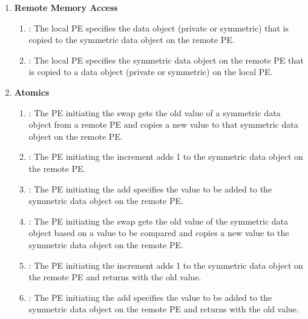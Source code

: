 \begin{enumerate}
\item \textbf{Remote Memory Access}
\begin{enumerate}
    \item \PUT:  The local \ac{PE} specifies the \source{} data object (private
        or symmetric) that is copied to the symmetric data object on the remote
        \ac{PE}. 
  \item \GET:  The local \ac{PE} specifies the symmetric data object on the remote
      \ac{PE} that is copied to a data object (private or symmetric) on the local
      \ac{PE}. 
\end{enumerate}

\item \textbf{Atomics}
\begin{enumerate}
    \item {}:  The \ac{PE} initiating the swap gets the old value 
    of a symmetric data object from a remote \ac{PE} and copies a new value to
        that symmetric data object on the remote \ac{PE}.
  \item {}:  The \ac{PE} initiating the increment adds 1 to the
      symmetric data object on the remote \ac{PE}.
  \item {}:  The \ac{PE} initiating the add specifies the value to be added
      to the symmetric data object on the remote \ac{PE}.
  \item {}:  The \ac{PE} initiating the 
  swap gets the old value of the symmetric data object based on a value to be compared and 
  copies a new value to the symmetric data object on the remote \ac{PE}.
  \item {}:  The \ac{PE} initiating the 
  increment adds 1 to the symmetric data object on the remote \ac{PE} and returns 
  with the old value.
  \item {}:  The \ac{PE} initiating the add 
  specifies the value to be added to the symmetric data object on the remote \ac{PE} 
  and returns with the old value.
\end{enumerate}


\end{enumerate}
